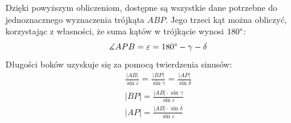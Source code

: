 Dzięki powyższym obliczeniom, dostępne są wszystkie dane potrzebne do jednoznacznego wyznaczenia trójkąta $ABP$. Jego trzeci kąt można obliczyć, korzystając z własności, że suma kątów w trójkącie wynosi $180\degree$:
$$
\measuredangle APB = \varepsilon = 180\degree - \gamma - \delta
$$
Długości boków uzyskuje się za pomocą twierdzenia sinusów:
\begin{gather*}
\frac{|AB|}{\sin\varepsilon} = \frac{|BP|}{\sin\gamma} = \frac{|AP|}{\sin\delta} \\[1em]
|BP| = \frac{|AB| \cdot \sin\gamma}{\sin\varepsilon} \\[1em]
|AP| = \frac{|AB| \cdot \sin\delta}{\sin\varepsilon}
\end{gather*}

